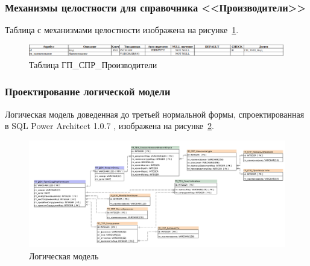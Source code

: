
\subsubsection*{Механизмы целостности для справочника <<Производители>>}

Таблица с механизмами целостности изображена на рисунке~\ref{fig:Logic_DE_CTL_Producers}.

\begin{figure}[!h]
    \centering

    \includegraphics[width=18cm]
    {assets/database/Types/ГП_СПР_Производители.png}

    \caption{Таблица ГП\_СПР\_Производители}

    \label{fig:Logic_DE_CTL_Producers}
\end{figure}


\subsubsection*{Проектирование логической модели}

Логическая модель доведенная до третьей нормальной формы,
спроектированная в SQL Power Architect 1.0.7 \cite{SqlPowerArhitect},
изображена на рисунке~\ref{fig:logic_model}.

\begin{figure}[!h]
    \centering

    \includegraphics[width=18cm]
    {assets/database/SqlPowerArchitect/logic_model.pdf}

    \caption{Логическая модель}

    \label{fig:logic_model}
\end{figure}

